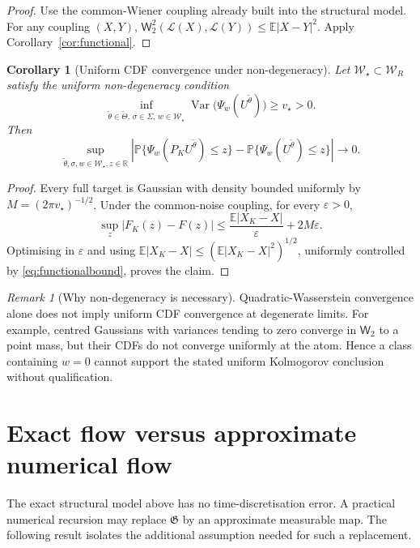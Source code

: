 \documentclass[11pt]{article}
\newtheorem{corollary}[assumption]{Corollary}
\theoremstyle{remark}
\newtheorem{remark}[assumption]{Remark}
\newcommand{\E}{\mathbb E}
\newcommand{\Pp}{\mathbb P}
\newcommand{\R}{\mathbb R}
\newcommand{\1}{\mathbf 1}
\newcommand{\Wass}{\mathsf W_2}
\newcommand{\Law}{\mathcal L}
\newcommand{\ThetaI}{\widetilde\Theta}
\begin{document}
\begin{proof}
Use the common-Wiener coupling already built into the structural model.  For any coupling \((X,Y)\), \(\Wass^2(\Law(X),\Law(Y))\le\E|X-Y|^2\).  Apply Corollary~\ref{cor:functional}.
\end{proof}

\begin{corollary}[Uniform CDF convergence under non-degeneracy]\label{cor:cdf}
Let \(\mathcal W_\star\subset\mathcal W_R\) satisfy the uniform non-degeneracy condition
\[
 \inf_{\widetilde\theta\in\ThetaI,\,\sigma\in\Sigma,\,w\in\mathcal W_\star}
 \operatorname{Var}\bigl(\Psi_w(U^{\widetilde\theta})\bigr)
 \ge v_\star>0.
\]
Then
\[
 \sup_{\widetilde\theta,\sigma,w\in\mathcal W_\star,z\in\R}
 \left|
 \Pp\{\Psi_w(P_KU^{\widetilde\theta})\le z\}
 -\Pp\{\Psi_w(U^{\widetilde\theta})\le z\}
 \right|
 \longrightarrow0.
\]
\end{corollary}

\begin{proof}
Every full target is Gaussian with density bounded uniformly by
\(M=(2\pi v_\star)^{-1/2}\).  Under the common-noise coupling, for every \(\varepsilon>0\),
\[
 \sup_z|F_K(z)-F(z)|
 \le \frac{\E|X_K-X|}{\varepsilon}+2M\varepsilon.
\]
Optimising in \(\varepsilon\) and using \(\E|X_K-X|\le(\E|X_K-X|^2)^{1/2}\), uniformly controlled by \eqref{eq:functionalbound}, proves the claim.
\end{proof}

\begin{remark}[Why non-degeneracy is necessary]
Quadratic-Wasserstein convergence alone does not imply uniform CDF convergence at degenerate limits.  For example, centred Gaussians with variances tending to zero converge in \(\mathsf W_2\) to a point mass, but their CDFs do not converge uniformly at the atom.  Hence a class containing \(w=0\) cannot support the stated uniform Kolmogorov conclusion without qualification.
\end{remark}

\section{Exact flow versus approximate numerical flow}

The exact structural model above has no time-discretisation error.  A practical numerical recursion may replace \(\mathfrak G\) by an approximate measurable map.  The following result isolates the additional assumption needed for such a replacement.
\end{document}
